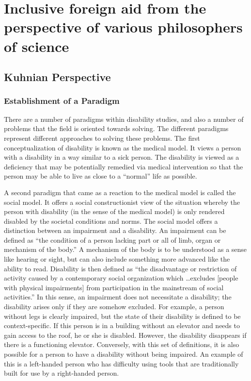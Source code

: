 \documentclass[a4paper]{article}
\begin{document}
\newpage
\section{Inclusive foreign aid from the perspective of various philosophers of
science}

\subsection{Kuhnian Perspective}

\subsubsection{Establishment of a Paradigm}
\label{models}

There are a number of paradigms within disability studies, and also a number
of problems that the field is oriented towards solving. The different
paradigms represent different approaches to solving these problems. The first
conceptualization of disability is known as the medical model. It views a
person with a disability in a way similar to a sick person. The disability is
viewed as a deficiency that may be potentially remedied via medical
intervention so that the person may be able to live as close to a ``normal''
life as possible. 

A second paradigm that came as a reaction to the medical model is called the
social model. It offers a social constructionist view of the situation whereby
the person with disability (in the sense of the medical model) is only
rendered  disabled by the societal conditions and norms. The social model
offers a distinction between an impairment and a disability. An impairment can
be defined as ``the condition of a person lacking part or all of limb, organ
or mechanism of the body.'' A mechanism of the body is to be understood as a
sense like hearing or sight, but can also include something more advanced like
the ability to read. Disability is then defined as ``the disadvantage or
restriction of activity caused by a contemporary social organization which
\ldots excludes [people with physical impairments] from participation in the
mainstream of social activities.'' In this sense, an impairment does not
necessitate a disability; the disability arises only if they are somehow
excluded. For example, a person without legs is clearly impaired, but the
state of their disability is defined to be context-specific. If this person is
in a building without an elevator and needs to gain access to the roof, he or
she is disabled. However, the disability disappears if there is a functioning
elevator. Conversely, with this set of definitions, it is also possible for a
person to have a disability without being impaired. An example of this is a
left-handed person who has difficulty using tools that are traditionally built
for use by a right-handed person.
\end{document}
